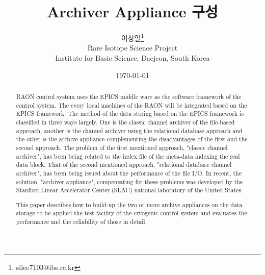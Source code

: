 \documentclass[11pt
  , a4paper
  , article
  , oneside
]{memoir}
\begin{document}
\newcommand{\technumber}{
  RAON Control-Document Series\\
  Revision : v1.0,   Release : 2014-12-24 fixed date}
\title{\textbf{Archiver Appliance 구성}}

\author{이상일\thanks{silee7103@ibs.re.kr} \\

  Rare Isotope Science Project\\
  Institute for Basic Science, Daejeon, South Korea
}
\date{\today}

\renewcommand{\maketitlehooka}{\begin{flushright}\textsf{\technumber}\end{flushright}}

\maketitle

\begin{abstract}
RAON control system uses the EPICS middle ware as the software framework of the control system. The every local machines of the RAON will be integrated based on the EPICS framework. The method of the data storing based on the EPICS framework is classified in three ways largely. One is the classic channel archiver of the file-based approach, another is the channel archiver using the relational database approach and the other is the archive appliance complementing the disadvantages of the first and the second approach. The problem of the first mentioned approach, "classic channel archiver", has been being related to the index file of the meta-data indexing the real data block. That of the second mentioned approach, "relational database channel archiver", has been being issued about the performance of the file I/O. In recent, the solution, "archiver appliance", compensating for these problems was developed by the Stanford Linear Accelerator Center (SLAC) national laboratory of the United States.

This paper describes how to build-up the two or more archive appliances on the data storage to be applied the test facility of the cryogenic control system and evaluates the performance and the reliability of those in detail.
\end{abstract}
\end{document}
